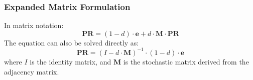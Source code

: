 \documentclass[12pt, a4paper,oneside]{book}
\begin{document}
\subsubsection*{Expanded Matrix Formulation}
In matrix notation:
\[
\mathbf{PR} = (1 - d) \cdot \mathbf{e} + d \cdot \mathbf{M} \cdot \mathbf{PR}
\]
The equation can also be solved directly as:
\[
\mathbf{PR} = (I - d \cdot \mathbf{M})^{-1} \cdot (1 - d) \cdot \mathbf{e}
\]
where \( I \) is the identity matrix, and \( \mathbf{M} \) is the stochastic matrix derived from the adjacency matrix.





\nocite{IDOLpro}
\nocite{EmerGNN}
\nocite{DGNN-DDI}
\nocite{survey}
\nocite{GCN}
\nocite{GAT}
\nocite{SAGPool}



\printbibliography[heading=bibintoc, title={\textcolor{blue}{ BIBLIOGRAPHY}}, nottype={online}]
\end{document}

